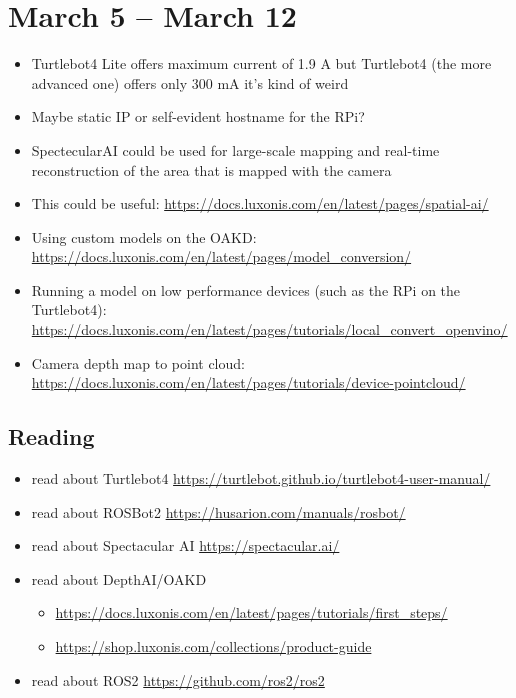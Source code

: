 \documentclass{article}
\begin{document}
\section{March 5 -- March 12}
\begin{itemize}
    \item Turtlebot4 Lite offers maximum current of 1.9 A but Turtlebot4 (the more advanced one) offers only 300 mA \textrightarrow it's kind of weird
    \item Maybe static IP or self-evident hostname for the RPi?
    \item SpectecularAI could be used for large-scale mapping and real-time reconstruction of the area that is mapped with the camera
    \item This could be useful: \url{https://docs.luxonis.com/en/latest/pages/spatial-ai/}
    \item Using custom models on the OAKD: \url{https://docs.luxonis.com/en/latest/pages/model_conversion/}
    \item Running a model on low performance devices (such as the RPi on the Turtlebot4): \url{https://docs.luxonis.com/en/latest/pages/tutorials/local_convert_openvino/}
    \item Camera depth map to point cloud: \url{https://docs.luxonis.com/en/latest/pages/tutorials/device-pointcloud/}
\end{itemize}

\subsection{Reading}
\begin{itemize}
\item read about Turtlebot4 \url{https://turtlebot.github.io/turtlebot4-user-manual/}

\item read about ROSBot2 \url{https://husarion.com/manuals/rosbot/}

\item read about Spectacular AI \url{https://spectacular.ai/}

\item read about DepthAI/OAKD
\begin{itemize}
    \item \url{https://docs.luxonis.com/en/latest/pages/tutorials/first_steps/}
    \item  \url{https://shop.luxonis.com/collections/product-guide}
\end{itemize}

\item read about ROS2 \url{https://github.com/ros2/ros2}


\end{itemize}
\end{document}
